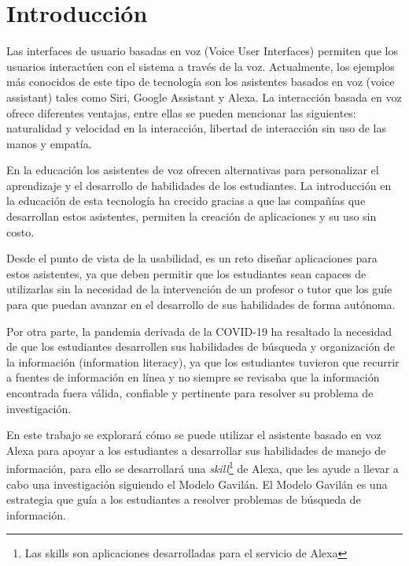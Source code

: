 
\chapter{Introducción}
\label{capI}



Las interfaces de usuario basadas en voz (Voice User Interfaces) permiten que los usuarios interactúen con el sistema a través de la voz. Actualmente, los ejemplos más conocidos de este tipo de tecnología son los asistentes basados en voz (voice assistant) tales como Siri, Google Assistant y Alexa. La interacción basada en voz ofrece diferentes ventajas, entre ellas se pueden mencionar las siguientes: naturalidad y velocidad en la interacción, libertad de interacción sin uso de las manos y empatía.

En la educación los asistentes de voz ofrecen alternativas para personalizar el aprendizaje y el desarrollo de habilidades de los estudiantes. La introducción en la educación de esta tecnología ha crecido gracias a que las compañías que desarrollan estos asistentes, permiten la creación de aplicaciones y su uso sin costo.

Desde el punto de vista de la usabilidad, es un reto diseñar aplicaciones para estos asistentes, ya que deben permitir que los estudiantes sean capaces de utilizarlas sin la necesidad de la intervención de un profesor o tutor que los guíe para que puedan avanzar en el desarrollo de sus habilidades de forma autónoma.

Por otra parte, la pandemia derivada de la COVID-19 ha resaltado la necesidad de que los estudiantes desarrollen sus habilidades de búsqueda y organización de la información (information literacy), ya que los estudiantes tuvieron que recurrir a fuentes de información en línea y no siempre se revisaba que la información encontrada fuera válida, confiable y pertinente para resolver su problema de investigación. 

En este trabajo se explorará cómo se puede utilizar el asistente basado en voz Alexa para apoyar a los estudiantes a desarrollar sus habilidades de manejo de información, para ello se desarrollará una \textit{skill}\footnote{Las skills son aplicaciones desarrolladas para el servicio de Alexa} de Alexa, que les ayude a llevar a cabo una investigación siguiendo el Modelo Gavilán. El Modelo Gavilán es una estrategia que guía a los estudiantes a resolver problemas de búsqueda de información.

